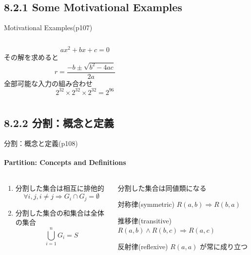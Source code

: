 \subsection{8.2.1 Some Motivational Examples}
\begin{frame}{Motivational Examples(p107)}
\begin{columns}
\begin{column}{0.5\textwidth}
\[ ax^2+bx+c = 0 \]
\pause
その解を求めると
\[ r=\frac{-b \pm \sqrt{b^2-4ac}}{2a} \]
\pause
全部可能な入力の組み合わせ
\[ 2^{32} \times 2^{32} \times 2^{32} = 2^{96}\]
\end{column}
\begin{column}{0.5\textwidth}
\end{column}
\end{columns}
\end{frame}
\subsection{8.2.2 分割：概念と定義}
\begin{frame}{分割：概念と定義(p108)}
\framesubtitle{Partition: Concepts and Definitions}
\begin{columns}
\begin{column}{0.5\textwidth}
\begin{enumerate}
\item 分割した集合は相互に排他的
    \[ \forall i,j,i\neq j \Rightarrow G_i \cap G_j = \emptyset \]
\pause
\item 分割した集合の和集合は全体の集合
    \[ \bigcup_{i=1}^{n} G_i = S \]
\end{enumerate}

\end{column}
\pause
\begin{column}{0.5\textwidth}
分割した集合は同値類になる
\begin{block}{対称律(symmetric)} $R(a,b) \Rightarrow R(b,a) $ \end{block}
\begin{block}{推移律(transitive)} $R(a,b) \wedge R(b,c) \Rightarrow R(a,c)$ \end{block}
\begin{block}{反射律(reflexive)} $R(a,a)$ が常に成り立つ \end{block}
\end{column}
\end{columns}
\end{frame}
